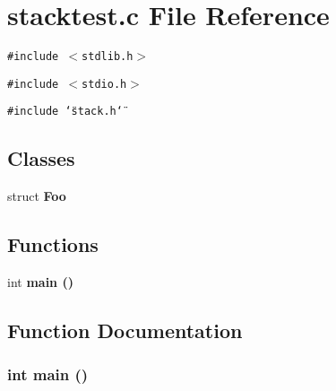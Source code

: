 \section{stacktest.c File Reference}
\label{stacktest_8c}
{\tt \#include $<$stdlib.h$>$}\par
{\tt \#include $<$stdio.h$>$}\par
{\tt \#include \char`\"{}stack.h\char`\"{}}\par
\subsection*{Classes}
\begin{CompactItemize}
\item 
struct \bf{Foo}
\end{CompactItemize}
\subsection*{Functions}
\begin{CompactItemize}
\item 
int \bf{main} ()
\end{CompactItemize}


\subsection{Function Documentation}
\subsubsection{\setlength{\rightskip}{0pt plus 5cm}int main ()}\label{stacktest_8c_e66f6b31b5ad750f1fe042a706a4e3d4}


